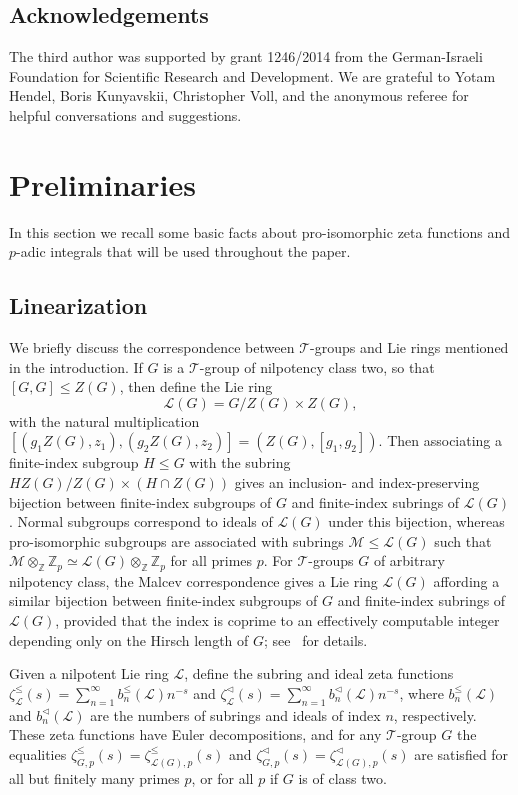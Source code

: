 \documentclass[11pt,a4paper]{amsart}
\theoremstyle{plain}
\theoremstyle{remark}
\newcommand{\Z}{\mathbb{Z}}
\newcommand{\tensor}{\otimes}
\begin{document}
\subsection{Acknowledgements}
The third author was supported by grant 1246/2014 from the German-Israeli Foundation for Scientific Research and Development.  We are grateful to Yotam Hendel, Boris Kunyavskii, Christopher Voll, and the anonymous referee for helpful conversations and suggestions.

\section{Preliminaries} \label{sec:methodology}
In this section we recall some basic facts about pro-isomorphic zeta functions and $p$-adic integrals that will be used throughout the paper.

\subsection{Linearization} \label{sec:linearization}
We briefly discuss the correspondence between $\mathcal{T}$-groups and Lie rings mentioned in the introduction.  If $G$ is a $\mathcal{T}$-group of nilpotency class two, so that $[G,G] \leq Z(G)$, then define the Lie ring
\begin{equation} \label{equ:class.two}
\mathcal{L}(G) = G / Z(G) \times Z(G),
\end{equation}
with the natural multiplication $[(g_1 Z(G), z_1),(g_2 Z(G), z_2)] = (Z(G), [g_1, g_2])$.  Then associating a finite-index subgroup $H \leq G$ with the subring $H Z(G) / Z(G) \times (H \cap Z(G))$ gives an inclusion- and index-preserving bijection between finite-index subgroups of $G$ and finite-index subrings of $\mathcal{L}(G)$.  Normal subgroups correspond to ideals of $\mathcal{L}(G)$ under this bijection, whereas pro-isomorphic subgroups are associated with subrings $\mathcal{M} \leq \mathcal{L}(G)$ such that $\mathcal{M} \tensor_\Z \Z_p \simeq \mathcal{L}(G) \tensor_\Z \Z_p$ for all primes $p$.  For $\mathcal{T}$-groups $G$ of arbitrary nilpotency class, the Malcev correspondence gives a Lie ring $\mathcal{L}(G)$ affording a similar bijection between finite-index subgroups of $G$ and finite-index subrings of $\mathcal{L}(G)$, provided that the index is coprime to an effectively computable integer depending only on the Hirsch length of $G$; see~\cite[\S4]{GSS/88} for details.

Given a nilpotent Lie ring $\mathcal{L}$, define the subring and ideal zeta functions $\zeta^\leq_{\mathcal{L}}(s) = \sum_{n = 1}^\infty b^\leq_n(\mathcal{L}) n^{-s}$ and $\zeta^\vartriangleleft_{\mathcal{L}}(s) = \sum_{n = 1}^\infty b^\vartriangleleft_n(\mathcal{L}) n^{-s}$, where $b^\leq_n(\mathcal{L})$ and $b^\vartriangleleft_n(\mathcal{L})$ are the numbers of subrings and ideals of index $n$, respectively.  These zeta functions have Euler decompositions, and for any $\mathcal{T}$-group $G$ the equalities $\zeta^\leq_{G,p}(s) = \zeta^\leq_{\mathcal{L}(G),p}(s)$ and $\zeta^\vartriangleleft_{G,p}(s) = \zeta^\vartriangleleft_{\mathcal{L}(G),p}(s)$ are satisfied for all but finitely many primes $p$, or for all $p$ if $G$ is of class two.
\end{document}
